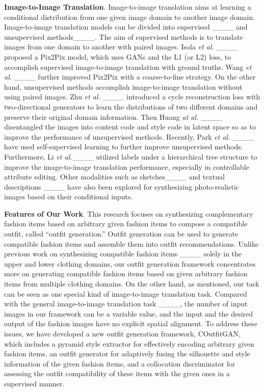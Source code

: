 \textbf{Image-to-Image Translation}.
Image-to-image translation aims at learning a conditional distribution from one given image domain to another image domain.
Image-to-image translation models can be divided into supervised ____ and unsupervised methods____.
The aim of supervised methods is to translate images from one domain to another with paired images.
Isola \textit{et al.} ____ proposed a Pix2Pix model, which uses GANs and the L1 (or L2) loss, to accomplish supervised image-to-image translation with ground truths.
Wang \textit{et al.} ____ further improved Pix2Pix with a coarse-to-fine strategy.
On the other hand, unsupervised methods accomplish image-to-image translation without using paired images.
Zhu \textit{et al.} ____ introduced a cycle reconstruction loss with two-directional generators to learn the distributions of two different domains and preserve their original domain information.
Then Huang \textit{at al.} ____ disentangled the images into content code and style code in latent space so as to improve the performance of unsupervised methods.
Recently, Park \textit{et al.} ____ have used self-supervised learning to further improve unsupervised methods. Furthermore, Li \textit{et al.}____ utilized labels under a hierarchical tree structure to improve the image-to-image translation performance, especially in controllable attribute editing. Other modalities such as sketches____ and textual descriptions ____ have also been explored for synthesizing photo-realistic images based on their conditional inputs.

\textbf{Features of Our Work}.
This research focuses on synthesizing complementary fashion items based on arbitrary given fashion items to compose a compatible outfit, called ``outfit generation.''
Outfit generation can be used to generate compatible fashion items and assemble them into outfit recommendations.
Unlike previous work on synthesizing compatible fashion items ____ solely in the upper and lower clothing domains, our outfit generation framework concentrates more on generating compatible fashion items based on given arbitrary fashion items from multiple clothing domains.
On the other hand, as mentioned, our task can be seen as one special kind of image-to-image translation task.
Compared with the general image-to-image translation task ____, the number of input images in our framework can be a variable value, and the input and the desired output of the fashion images have no explicit spatial alignment.
To address these issues, we have developed a new outfit generation framework, COutfitGAN, which includes a pyramid style extractor for effectively encoding arbitrary given fashion items, an outfit generator for adaptively fusing the silhouette and style information of the given fashion items, and a collocation discriminator for assessing the outfit compatibility of these items with the given ones in a supervised manner.
